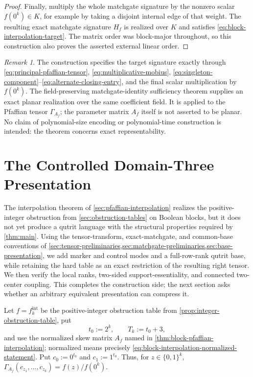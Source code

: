 \documentclass[11pt]{article}
\theoremstyle{definition}
\theoremstyle{remark}
\newtheorem{remark}[theorem]{Remark}
\newcommand{\bits}{\{0,1\}}
\begin{document}
\begin{proof}
Finally, multiply the whole matchgate signature by the nonzero scalar
$f(0^k)\in K$, for example by taking a disjoint internal edge of that
weight.  The resulting exact matchgate signature $H_f$ is realized over
$K$ and satisfies
\eqref{eq:block-interpolation-target}.  The matrix order was block-major
throughout, so this construction also proves the asserted external linear
order.
\end{proof}

\begin{remark}
The construction specifies the target signature exactly through
\eqref{eq:principal-pfaffian-tensor},
\eqref{eq:multiplicative-mobius},
\eqref{eq:singleton-component}--\eqref{eq:alternate-closing-entry}, and the
final scalar multiplication by $f(0^k)$.
The field-preserving matchgate-identity sufficiency theorem supplies an
exact planar realization over the same coefficient field.  It is applied
to the Pfaffian tensor $\Gamma_{A_f}$; the parameter matrix $A_f$ itself is
not asserted to be planar.  No claim of polynomial-size encoding or
polynomial-time construction is intended: the theorem concerns exact
representability.
\end{remark}

\section{The Controlled Domain-Three Presentation}
\label{sec:domain-three-construction}

The interpolation theorem of \cref{sec:pfaffian-interpolation} realizes the
positive-integer obstruction from \cref{sec:obstruction-tables} on Boolean
blocks, but it does not yet produce a qutrit language with the structural
properties required by \cref{thm:main}.  Using the tensor-transform,
exact-matchgate, and common-base conventions of
\cref{sec:tensor-preliminaries,sec:matchgate-preliminaries,sec:base-presentation},
we add marker and control modes and a full-row-rank qutrit base, while
retaining the hard table as an exact restriction of the resulting right
tensor.  We then verify the local ranks, two-sided support-essentiality, and
connected two-center coupling.  This completes the construction side; the
next section asks whether an arbitrary equivalent presentation can compress
it.

Let $f=f_k^{\mathrm{int}}$ be the positive-integer obstruction table from
\cref{prop:integer-obstruction-table}, put
\[
  t_0:=2^k,
  \qquad T_k:=t_0+3,
\]
and use the normalized skew matrix $A_f$ named in
\cref{thm:block-pfaffian-interpolation}; normalized means precisely
\eqref{eq:block-interpolation-normalized-statement}.  Put
$c_0:=0^{t_0}$ and $c_1:=1^{t_0}$.  Thus, for $z\in\bits^k$,
$\Gamma_{A_f}(c_{z_1},\ldots,c_{z_k})=f(z)/f(0^k)$.
\end{document}
